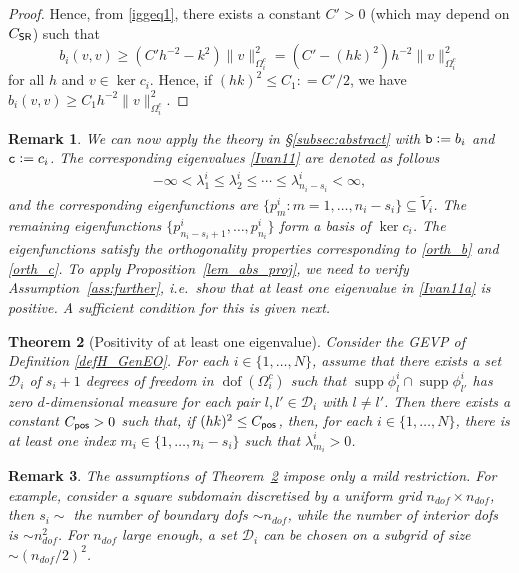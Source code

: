 \documentclass[numbers,webpdf,imaiai]{ima-authoring-template}%
\theoremstyle{thmstyletwo}%
\newtheorem{theorem}{Theorem}[section]
\newtheorem{remark}[theorem]{Remark}
\numberwithin{equation}{section}
\newcommand{\txtb}{\textup{\texttt{b}}}
\newcommand{\txtc}{\textup{\texttt{c}}}
\newcommand{\wV}{\widetilde{V}}
\newcommand{\shapereg}{C_{\textup{\textsf{SR}}}}
\newcommand{\Cpos}{C_{\textup{\textsf{pos}}}}
\newcommand{\assign}{\mathrel{\mathop:}=}
\numberwithin{equation}{section}
\DeclareMathOperator{\supp}{supp}
\DeclareMathOperator{\dof}{dof}
\begin{document}
{\begin{proof}
Hence, from \eqref{iggeq1}, there exists a constant $C'>0$ (which may depend on $\shapereg$) such that
\[
	b_i (v,v) \ge (C' h^{-2} - k^2) \|v\|_{\Omega_i^c}^2 
	= (C' - (hk)^2) h^{-2} \|v\|_{\Omega_i^c}^2
\]
for all $h$ and $v \in \ker c_i$. Hence, if $(hk)^2 \le C_1\assign C'/2$, we have
$b_i (v,v) \ge C_1 h^{-2} \|v\|_{\Omega_i^c}^2$.
\end{proof}

\begin{remark} \label{rem:apply}
We can now apply the theory in \S \ref{subsec:abstract} with
$\txtb \assign b_{i}$ and $\txtc \assign c_{i}$. 
The corresponding eigenvalues \eqref{Ivan11} are denoted as follows
\begin{align} \label{Ivan11a}
	-\infty < \lambda_1^i \leq \lambda_2^i \leq \cdots \leq \lambda_{n_i-s_i}^i < \infty,
\end{align}
and the corresponding eigenfunctions are $\{p_m^i: m = 1, \ldots, n_i-s_i\} \subseteq \wV_i$.
The remaining eigenfunctions
$\{p_{n_i-s_i+1}^i, \ldots , p_{n_i}^i\}$ form a basis of $\ker c_i$.
The eigenfunctions satisfy the orthogonality properties corresponding to \eqref{orth_b} and \eqref{orth_c}.
To apply Proposition~\ref{lem_abs_proj}, we need to verify Assumption~\ref{ass:further}, i.e.\ 
show that at least one eigenvalue in \eqref{Ivan11a} is positive.
A sufficient condition for this is given next.
\end{remark}
 
\begin{theorem}[Positivity of at least one eigenvalue]\label{pos_ev}
Consider the GEVP of Definition \ref{defH_GenEO}.
For each $i\in\{1,\ldots,N\}$, assume that there exists a set $\mathcal{D}_i$ of
$s_i+1$ degrees of freedom in $\dof(\Omega_i^c)$ 
such that $\supp\phi_l^i\cap\supp\phi_{l'}^i$ has zero $d$-dimensional measure
for each pair $l,l' \in \mathcal{D}_i$ with $l\ne l'$.
Then there exists a constant $\Cpos>0$ such that, if $(hk)^2 \le \Cpos$, 
then, for each $i\in\{1,\ldots,N\}$, there is at least one index $m_i\in\{1,\ldots,n_i-s_i\}$ 
such that $\lambda_{m_i}^i > 0$.
\end{theorem}

\begin{remark}\label{rem:modest} 
The assumptions of Theorem~\ref{pos_ev} impose only a mild restriction.
For example, consider a square subdomain discretised by a uniform grid
$n_{dof}\times n_{dof}$, then $s_i \sim$ the number of boundary dofs $\sim n_{dof}$,
while the number of interior dofs is $\sim n_{dof}^2$.
For $n_{dof}$ large enough, a  set $\mathcal{D}_i$ can be chosen on  a
subgrid of size $\sim (n_{dof}/2)^2$.   
\end{remark}

}
\end{document}
